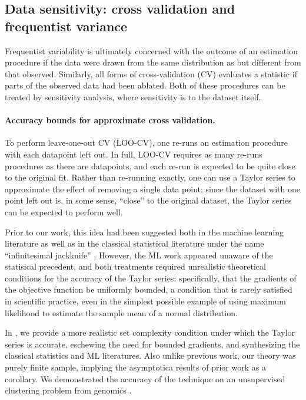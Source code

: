 \subsection*{Data sensitivity: cross validation and frequentist variance}

Frequentist variability is ultimately concerned with the outcome of an
estimation procedure if the data were drawn from the same distribution as but
different from that observed.  Similarly, all forms of cross-validation (CV)
evaluates a statistic if parts of the observed data had been ablated.  Both of
these procedures can be treated by sensitivity analysis, where sensitivity
is to the dataset itself.

\paragraph{Accuracy bounds for approximate cross validation.}

To perform leave-one-out CV (LOO-CV), one re-runs an estimation procedure with
each datapoint left out.  In full, LOO-CV requires as many re-runs procedures as
there are datapoints, and each re-run is expected to be quite close to the
original fit.  Rather than re-running exactly, one can use a Taylor series to
approximate the effect of removing a single data point; since the dataset with
one point left out is, in some sense, ``close'' to the original dataset, the
Taylor series can be expected to perform well.

Prior to our work, this idea had been suggested both in the machine learning
literature \citep{rad:2018:scalableloo, koh:2017:blackbox} as well as in the
classical statistical literature under the name ``infinitesimal jackknife''
\citep{jaeckel:1972:infinitesimal, shao:2012:jackknife}.  However, the ML work
appeared unaware of the statisical precedent, and both treatments required
unrealistic theoretical conditions for the accuracy of the Taylor series:
specifically, that the gradients of the objective function be uniformly bounded,
a condition that is rarely satisfied in scientific practice, even in the
simplest possible example of using maximum likelihood to estimate the sample
mean of a normal distribution.

In \citet{giordano:2019:ij}, we provide a more realistic set complexity
condition under which the Taylor series is accurate, eschewing the need for
bounded gradients, and synthesizing the classical statistics and ML literatures.
Also unlike previous work, our theory was purely finite sample, implying the
asymptotica results of prior work as a corollary.  We demonstrated the accuracy
of the technique on an unsupervised clustering problem from genomics
\citep{shoemaker:2015:ultrasensitive}.


